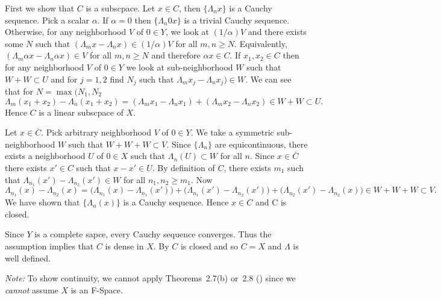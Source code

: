 \begin{enumerate}
\begin{itemize}
  First we show that $C$ is a subscpace.
  Let \(x\in C\), then
  \(\{\Lambda_n x\}\) is a Cauchy sequence. 
  Pick a scalar \(\alpha\). If \(\alpha=0\) then  \(\{\Lambda_n 0x\}\)
  is a trivial Cauchy sequence.
  Otherwise, for any neighborhood $V$ of \(0\in Y\), we look at 
  \((1/\alpha)V\) and there exists some $N$ such that 
  \((\Lambda_m x - \Lambda_n x) \in (1/\alpha)V\) for all \(m,n\geq N\).
  Equivalently,
  \((\Lambda_m \alpha x - \Lambda_n \alpha x) \in V\) for all \(m,n\geq N\)
  and therefore \(\alpha x \in C\).
  If \(x_1,x_2\in C\) then for any neighborhood $V$ of \(0\in Y\)
  we look at sub-neighborhood $W$ such that \(W+W\subset U\)
  and for \(j=1,2\) find \(N_j\) such that 
  \(\Lambda_m x_j - \Lambda_n x_j) \in W\).
  We can see that for \(N=\max(N_1,N_2\)
  \begin{equation*}
   \Lambda_m (x_1+x_2) - \Lambda_n (x_1+x_2)
   = 
     (\Lambda_m x_1 - \Lambda_n x_1) +
     (\Lambda_m x_2 - \Lambda_n x_2)
   \in W + W \subset U.
  \end{equation*}
  Hence $C$ is a linear subscpace of $X$.
  
  Let \(x\in \overline{C}\).
  Pick arbitrary neighborhood $V$ of \(0\in Y\).
  We take a symmetric sub-neighborhood $W$ such that \(W + W + W \subset V\).
  Since \(\{\Lambda_n\}\) are equicontinuous, there exists a neighborhood
  $U$ of \(0\in X\) such that \(\Lambda_n(U) \subset W\) for all $n$.
  Since \(x\in\overline{C}\) there exists \(x'\in C\) such that
  \(x-x'\in U\). By definition of $C$, there exists \(m_1\)
  such that \(\Lambda_{n_1}(x') - \Lambda_{n_2}(x') \in W\)
  for all \(n_1,n_2\geq m_1\). Now
  \begin{equation*}
   \Lambda_{n_1}(x) - \Lambda_{n_2}(x) =
      \bigl(\Lambda_{n_1}(x) - \Lambda_{n_1}(x')\bigr)
    +  \bigl(\Lambda_{n_1}(x') - \Lambda_{n_2}(x')\bigr)
    +  \bigl(\Lambda_{n_2}(x') - \Lambda_{n_2}(x)\bigr)
      \in W + W + W \subset V.
  \end{equation*}
  We have shown that \(\{\Lambda_n(x)\}\) is a Cauchy sequence.
  Hence \(x\in C\) and C is closed.
  

  Since $Y$ is a complete sapce, every Cauchy sequence converges.
  Thus the assumption implies that $C$ is dense in $X$. By 
  $C$ is closed and so  \(C=X\) and \(\Lambda\) is well defined.

  \emph{Note:} To show continuity,
  we cannot apply Theorems~2.7(b) or~2.8 (\cite{RudinFA79})
  since we \emph{cannot} assume $X$ is an F-Space.


\end{itemize}
\end{enumerate}
